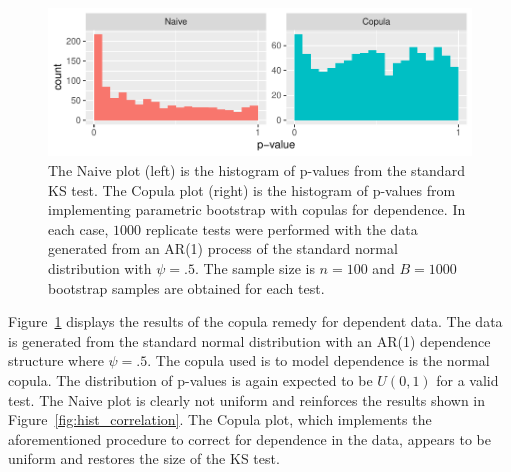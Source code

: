 \documentclass[12pt, letterpaper, titlepage]{article}
\begin{document}
\begin{figure}[tbp]
  \centering
  \includegraphics[width=\textwidth]{hist_ar1_D}
  \caption{The Naive plot (left) is the histogram of p-values from the
  standard KS test. The Copula plot (right) is the histogram of p-values from
  implementing parametric bootstrap with copulas for dependence. In each case,
  $1000$ replicate tests were performed with the data generated from an AR(1)
  process of the standard normal distribution with $\psi = .5$. The sample size
  is $n = 100$ and $B = 1000$ bootstrap samples are obtained for each test.}
  \label{fig:hist_ar1_D}
\end{figure}

Figure~\ref{fig:hist_ar1_D} displays the results of the copula remedy for
dependent data. The data is generated from the standard normal distribution with
an AR(1) dependence structure where $\psi = .5$. The copula used is to model
dependence is the normal copula. The distribution of p-values is again expected
to be $U(0, 1)$ for a valid test. The Naive plot is clearly not uniform and
reinforces the results shown in Figure~\ref{fig:hist_correlation}. The Copula
plot, which implements the aforementioned procedure to correct for dependence
in the data, appears to be uniform and restores the size of the KS test.
\end{document}
